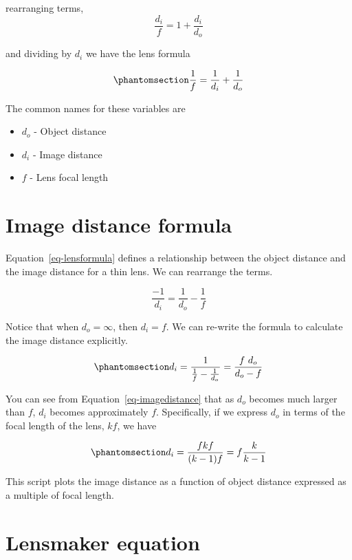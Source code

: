 \documentclass[
  letterpaper,
]{book}
\providecommand{\tightlist}{%
  \setlength{\itemsep}{0pt}\setlength{\parskip}{0pt}}\usepackage{longtable,booktabs,array}
\begin{document}
rearranging terms, \[ 
\frac{d_i}{f}  = 1 + \frac{d_i}{d_o} 
\]

and dividing by \(d_i\) we have the lens formula

\begin{equation}\phantomsection\label{eq-lensformula}{ 
\frac{1}{f}    = \frac{1}{d_i} + \frac{1}{d_o} 
}\end{equation}

The common names for these variables are

\begin{itemize}
\tightlist
\item
  \(d_o\) - Object distance
\item
  \(d_i\) - Image distance
\item
  \(f\) - Lens focal length
\end{itemize}

\section{Image distance formula}\label{sec-optics-imagedistance}

Equation~\ref{eq-lensformula} defines a relationship between the object
distance and the image distance for a thin lens. We can rearrange the
terms.

\[
\frac{-1}{d_i} = \frac{1}{d_o} - \frac{1}{f}
\]

Notice that when \(d_o = \infty\), then \(d_i = f\). We can re-write the
formula to calculate the image distance explicitly.

\begin{equation}\phantomsection\label{eq-imagedistance}{
d_i = \frac{1}{\frac{1}{f} - \frac{1}{d_o}} = \frac{f~d_o}{d_o - f} 
}\end{equation}

You can see from Equation~\ref{eq-imagedistance} that as \(d_o\) becomes
much larger than \(f\), \(d_i\) becomes approximately \(f\).
Specifically, if we express \(d_o\) in terms of the focal length of the
lens, \(k f\), we have

\begin{equation}\phantomsection\label{eq-imagedistance}{
d_i = \frac{f k f}{(k-1) f} = f \frac{k}{k-1}
}\end{equation}

This script plots the image distance as a function of object distance
expressed as a multiple of focal length.

\section{Lensmaker equation}\label{sec-optics-lensmaker}
\end{document}
